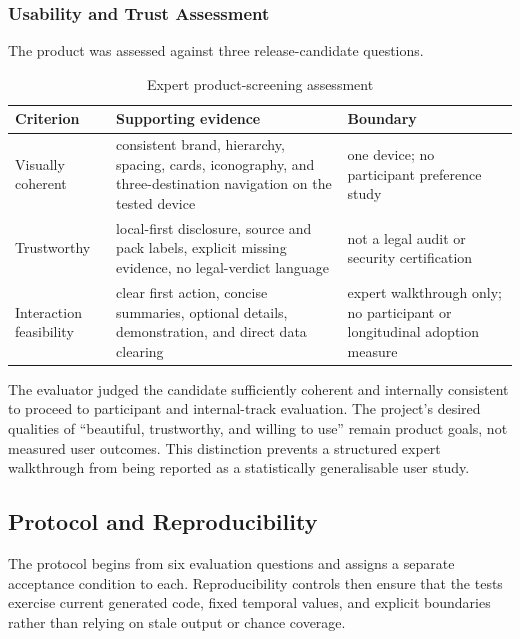 \subsubsection{Usability and Trust Assessment}

The product was assessed against three release-candidate questions.

\begin{table}[H]
\centering
\small
\caption{Expert product-screening assessment}
\begin{tabular}{>{\raggedright\arraybackslash}p{}>{\raggedright\arraybackslash}p{}>{\raggedright\arraybackslash}p{}}
\toprule
Criterion & Supporting evidence & Boundary \\
\midrule
Visually coherent & consistent brand, hierarchy, spacing, cards, iconography, and three-destination navigation on the tested device & one device; no participant preference study \\
Trustworthy & local-first disclosure, source and pack labels, explicit missing evidence, no legal-verdict language & not a legal audit or security certification \\
Interaction feasibility & clear first action, concise summaries, optional details, demonstration, and direct data clearing & expert walkthrough only; no participant or longitudinal adoption measure \\
\bottomrule
\end{tabular}
\end{table}

The evaluator judged the candidate sufficiently coherent and internally consistent to proceed to participant and internal-track evaluation. The project's desired qualities of ``beautiful, trustworthy, and willing to use'' remain product goals, not measured user outcomes. This distinction prevents a structured expert walkthrough from being reported as a statistically generalisable user study.

\subsection{Protocol and Reproducibility}

The protocol begins from six evaluation questions and assigns a separate acceptance condition to each. Reproducibility controls then ensure that the tests exercise current generated code, fixed temporal values, and explicit boundaries rather than relying on stale output or chance coverage.

